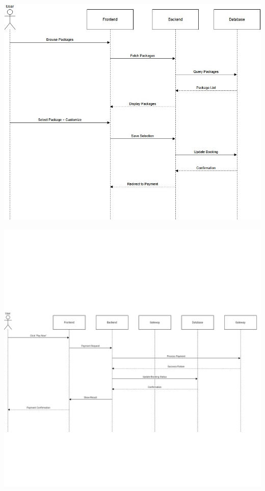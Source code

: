 \vspace{0.5cm}
\begin{center}
\includegraphics[width=1.0\textwidth]{./figures/Sequence Diagram/2_seq.jpg} %
\end{center}
\vspace{0.5cm}

\vspace{0.5cm}
\begin{center}
\includegraphics[width=1.0\textwidth]{./figures/Sequence Diagram/3_seq.png} %
\end{center}
\vspace{0.5cm}

